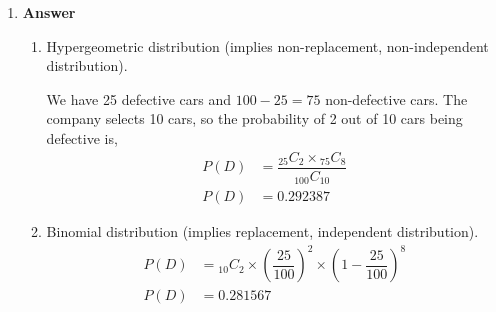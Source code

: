 \documentclass[12pt]{book}
\begin{document}
\begin{enumerate}
    
    
    
    
    
    
    \item \textbf{Answer}
    
    \begin{enumerate}
        \item Hypergeometric distribution (implies non-replacement, non-independent distribution). 
        
        We have 25 defective cars and $100 - 25 = 75$ non-defective cars. The company selects 10 cars, so the probability of 2 out of 10 cars being defective is,
        \begin{align*}
            P(D) &= \dfrac{{}_{25} C_{2} \times {}_{75} C_{8}}{{}_{100} C_{10}}\\
            P(D) &= 0.292387
        \end{align*}
        
        \item Binomial distribution (implies replacement, independent distribution).
        \begin{align*}
            P(D) &= {}_{10} C_{2} \times \left(\dfrac{25}{100}\right)^{2} \times \left(1 - \dfrac{25}{100}\right)^{8} \\
            P(D) &= 0.281567
        \end{align*}
    \end{enumerate}
    

\end{enumerate}
\end{document}
